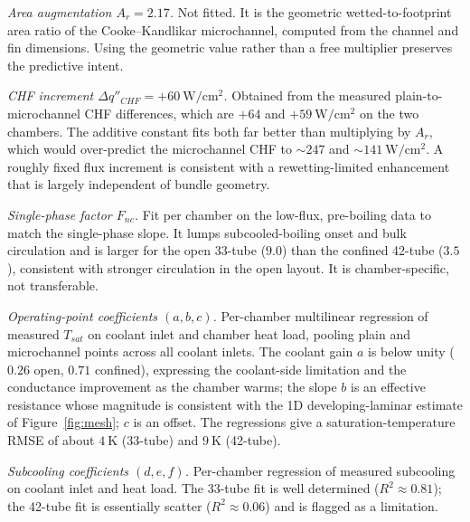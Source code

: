 \documentclass[11pt]{article}
\begin{document}
\textit{Area augmentation $A_r=2.17$.} Not fitted. It is the geometric wetted-to-footprint
area ratio of the Cooke--Kandlikar microchannel, computed from the channel and fin dimensions.
Using the geometric value rather than a free multiplier preserves the predictive intent.

\textit{CHF increment $\Delta q''_{CHF}=+60~\mathrm{W/cm^2}$.} Obtained from the measured
plain-to-microchannel CHF differences, which are $+64$ and $+59~\mathrm{W/cm^2}$ on the two
chambers. The additive constant fits both far better than multiplying by $A_r$, which would
over-predict the microchannel CHF to $\sim\!247$ and $\sim\!141~\mathrm{W/cm^2}$. A roughly
fixed flux increment is consistent with a rewetting-limited enhancement that is largely
independent of bundle geometry.

\textit{Single-phase factor $F_{nc}$.} Fit per chamber on the low-flux, pre-boiling data to
match the single-phase slope. It lumps subcooled-boiling onset and bulk circulation and is
larger for the open 33-tube ($9.0$) than the confined 42-tube ($3.5$), consistent with stronger
circulation in the open layout. It is chamber-specific, not transferable.

\textit{Operating-point coefficients $(a,b,c)$.} Per-chamber multilinear regression of measured
$T_{sat}$ on coolant inlet and chamber heat load, pooling plain and microchannel points across
all coolant inlets. The coolant gain $a$ is below unity ($0.26$ open, $0.71$ confined),
expressing the coolant-side limitation and the conductance improvement as the chamber warms; the
slope $b$ is an effective resistance whose magnitude is consistent with the 1D developing-laminar
estimate of Figure~\ref{fig:mesh}; $c$ is an offset. The regressions give a saturation-temperature
RMSE of about $4~\mathrm{K}$ (33-tube) and $9~\mathrm{K}$ (42-tube).

\textit{Subcooling coefficients $(d,e,f)$.} Per-chamber regression of measured subcooling on
coolant inlet and heat load. The 33-tube fit is well determined ($R^2\approx0.81$); the 42-tube
fit is essentially scatter ($R^2\approx0.06$) and is flagged as a limitation.
\end{document}
